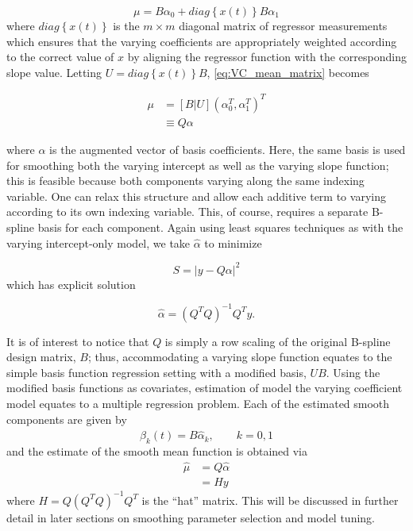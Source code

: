 \documentclass[12pt]{article}
\theoremstyle{definition}
\begin{document}
\begin{equation} \label{eq:VC_mean_matrix}
\mu = B\alpha_0 + diag\left\{x\left(t\right) \right\}B\alpha_1
\end{equation} 
\noindent
where $diag\left\{x\left(t\right) \right\}$ is the $m \times m$ diagonal matrix of regressor measurements which ensures that the varying coefficients are appropriately weighted according to the correct value of $x$ by aligning the regressor function with the corresponding slope value. Letting $U = diag\left\{x\left(t\right) \right\}B$, \ref{eq:VC_mean_matrix} becomes

\begin{align}
\mu &= \left[ B | U \right] \left(\alpha_0^T,\alpha_1^T\right)^T \\
&\equiv Q\alpha
\end{align} 

where $\alpha$ is the augmented vector of basis coefficients. Here, the same basis is used for smoothing both the varying intercept as well as the varying slope function; this is feasible because both components varying along the same indexing variable. One can relax this structure and allow each additive term to varying according to its own indexing variable. This, of course, requires a separate B-spline basis for each component. Again using least squares techniques as with the varying intercept-only model, we take $\hat{\alpha}$ to minimize

\begin{equation} \label{eq:S_varying_intercept_slope_model}
S = \vert y-Q\alpha \vert ^2
\end{equation}
which has explicit solution

\[
\hat{\alpha} =\left(Q^T Q\right)^{-1} Q^Ty.
\]

It is of interest to notice that $Q$ is simply a row scaling of the original B-spline design matrix, $B$; thus, accommodating a varying slope function equates to the simple basis function regression setting with a modified basis, $UB$. Using the modified basis functions as covariates, estimation of model the varying coefficient model equates to a multiple regression problem. Each of the estimated smooth components are given by 
\[
\hat{\beta}_k\left(t \right)= B\hat{\alpha}_k, \qquad k=0,1
\]
\noindent
and the estimate of the smooth mean function is obtained via 
\begin{align*}
\hat{\mu} &= Q\hat{\alpha}\\
&= Hy
\end{align*}
where $H = Q\left(Q^T Q\right)^{-1} Q^T$ is the ``hat'' matrix. This will be discussed in further detail in later sections on smoothing parameter selection and model tuning.
\end{document}
